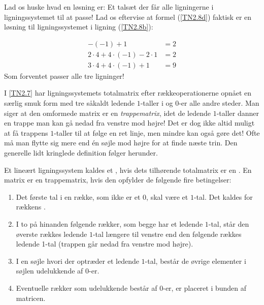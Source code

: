 \begin{aha}
Lad os huske hvad en løsning er: Et talsæt der får alle ligningerne i ligningssystemet til at passe! Lad os eftervise at formel (\ref{TN2.8d}) faktisk er en løsning til ligningssystemet i ligning (\ref{TN2.8b}):

$$
\begin{aligned}
-(-1) + 1 &= 2\\
2\cdot 4 + 4\cdot(-1) - 2\cdot 1 &= 2\\
3\cdot 4 + 4\cdot(-1) + 1 &= 9
\end{aligned}
$$
Som forventet passer alle tre ligninger!

\end{aha}

I \eqref{TN2.7} har ligningssystemets totalmatrix efter ræk\-ke\-ope\-ra\-tion\-er\-ne opnået en særlig smuk form med tre såkaldt ledende $1$-taller i  og $0$-er alle andre steder. Man siger at den omformede matrix er en \textit{trappematrix}, idet de ledende $1$-taller danner en trappe man kan gå nedad fra venstre mod højre! Det er dog ikke altid muligt at få trappens $1$-taller til at følge en ret linje, men mindre kan også gøre det! Ofte må man flytte sig mere end én søjle mod højre for at finde næste trin. Den generelle lidt kringlede definition følger herunder.  

\begin{definition}[Trappematrix]\label{TN2.13}
Et lineært ligningssystem kaldes et , hvis dets tilhørende totalmatrix er en . En matrix er en trappematrix, hvis den opfylder de følgende fire betingelser:
\begin{enumerate}
\item Det første tal i en række, som ikke er et $0$, skal være et $1$-tal. Det kaldes for rækkens .
\item I to på hinanden følgende rækker, som begge har et ledende $1$-tal, står den øverste rækkes ledende $1$-tal længere til venstre end den følgende rækkes ledende 1-tal (trappen går nedad fra venstre mod højre). 
\item I en søjle hvori der optræder et ledende $1$-tal, består de øvrige elementer i søjlen udelukkende af $0$-er.
\item Eventuelle rækker som udelukkende består af $0$-er, er  placeret i bunden af matricen.
\end{enumerate}
\end{definition}



